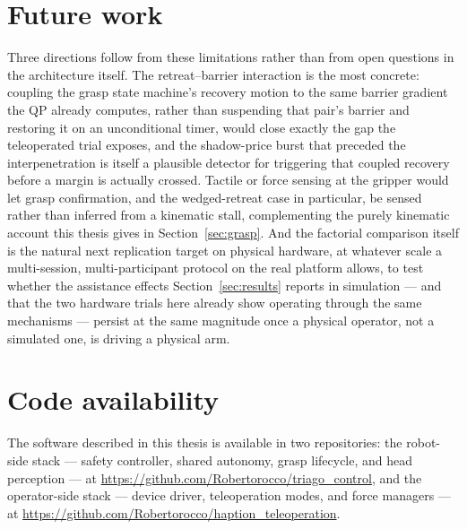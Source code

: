 \section{Future work}
\label{sec:conclfuture}

Three directions follow from these limitations rather than from open questions in the architecture itself. The retreat--barrier interaction is the most concrete: coupling the grasp state machine's recovery motion to the same barrier gradient the QP already computes, rather than suspending that pair's barrier and restoring it on an unconditional timer, would close exactly the gap the teleoperated trial exposes, and the shadow-price burst that preceded the interpenetration is itself a plausible detector for triggering that coupled recovery before a margin is actually crossed. Tactile or force sensing at the gripper would let grasp confirmation, and the wedged-retreat case in particular, be sensed rather than inferred from a kinematic stall, complementing the purely kinematic account this thesis gives in Section~\ref{sec:grasp}. And the factorial comparison itself is the natural next replication target on physical hardware, at whatever scale a multi-session, multi-participant protocol on the real platform allows, to test whether the assistance effects Section~\ref{sec:results} reports in simulation --- and that the two hardware trials here already show operating through the same mechanisms --- persist at the same magnitude once a physical operator, not a simulated one, is driving a physical arm.

\section*{Code availability}
The software described in this thesis is available in two repositories: the robot-side stack --- safety controller, shared autonomy, grasp lifecycle, and head perception --- at \url{https://github.com/Robertorocco/triago_control}, and the operator-side stack --- device driver, teleoperation modes, and force managers --- at \url{https://github.com/Robertorocco/haption_teleoperation}.


